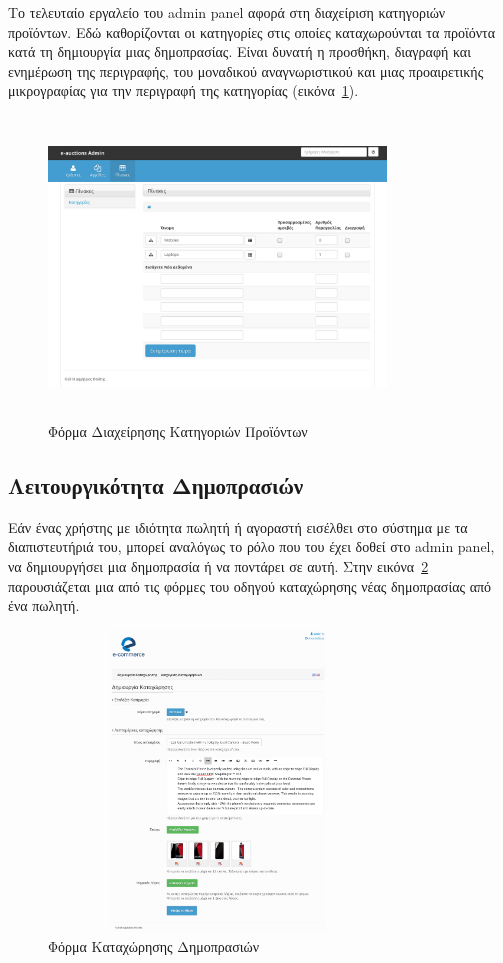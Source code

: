 \documentclass[12pt]{report}
\begin{document}
Το τελευταίο εργαλείο του \textlatin{admin panel} αφορά στη διαχείριση κατηγοριών προϊόντων. Εδώ καθορίζονται οι κατηγορίες στις οποίες καταχωρούνται τα προϊόντα κατά τη δημιουργία μιας δημοπρασίας. Είναι δυνατή η προσθήκη, διαγραφή και ενημέρωση της περιγραφής, του μοναδικού αναγνωριστικού και μιας προαιρετικής μικρογραφίας για την περιγραφή της κατηγορίας (εικόνα~\ref{fig:category_admin}).
\begin{figure}[H]
\centering
\includegraphics[width=0.8\textwidth, height=8cm]{Screenshot-2018-1-14-e-auctions-Admin-1}
\caption{Φόρμα Διαχείρησης Κατηγοριών Προϊόντων}
\label{fig:category_admin}
\end{figure}

\subsection{Λειτουργικότητα Δημοπρασιών}
Εάν ένας χρήστης με ιδιότητα πωλητή ή αγοραστή εισέλθει στο σύστημα με τα διαπιστευτήριά του, μπορεί αναλόγως το ρόλο που του έχει δοθεί στο \textlatin{admin panel}, να δημιουργήσει μια δημοπρασία ή να ποντάρει σε αυτή. Στην εικόνα~\ref{fig:auction_new} παρουσιάζεται μια από τις φόρμες του οδηγού καταχώρησης νέας δημοπρασίας από ένα πωλητή.
\begin{figure}[H]
\centering
\includegraphics[width=0.8\textwidth, height=8cm]{Screenshot-2018-1-14-Sell-e-auctions}
\caption{Φόρμα Καταχώρησης Δημοπρασιών}
\label{fig:auction_new}
\end{figure}
\end{document}
